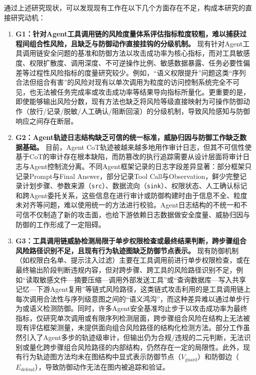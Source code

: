 通过上述研究现状，可以发现现有工作在以下几个方面存在不足，构成本研究的直接研究动机：
\begin{enumerate}
  \item \textbf{G1：针对Agent工具调用链的风险度量体系评估指标粒度较粗，难以捕获过程间组合性风险，且缺乏与防御动作直接挂钩的分级机制。}
  现有针对Agent工具调用链安全问题的基准和防御方法以攻击成功率为核心指标，而对工具敏感度、权限扩散度、调用深度、不可逆操作比例、敏感数据暴露、任务必要性偏差等过程性风险指标的度量研究较少。例如，“语义权限提升”问题这类“序列合法但组合有害”的风险对现有以单次调用为粒度的访问控制系统完全不可见，也无法被任务完成率或攻击成功率等结果导向指标所量化。更重要的是，即使能够输出风险分数，现有方法也缺乏将风险等级直接映射为可操作防御动作（放行/记录/脱敏/人工确认/阻断回滚）的分级机制，导致风险感知与防御响应之间存在断层。

  \item \textbf{G2：Agent轨迹日志结构缺乏可信的统一标准，威胁归因与防御工作缺乏数据基础。}
  目前，Agent CoT轨迹被越来越多地用作审计日志，但其不可信性使基于CoT的审计存在根本缺陷，而防篡改的执行追踪需要从设计层面将审计日志与Agent控制流分离\cite{chu2026systematic,dehghantanha2026sokattacksurfaceagentic}。不同Agent框架记录的日志字段差异显著：部分框架只记录Prompt与Final Answer，部分记录Tool Call与Observation，鲜少完整记录计划步骤、参数来源（\texttt{src}）、数据流向（\texttt{sink}）、权限状态、人工确认标记和跨Agent委托关系\cite{chan2024visibility,microsoft2025taxonomy,wang2026agenttraces}，这些信息在进行审计或防御构建时由于信息不全、粒度未对齐等问题，难以使用统一的方法进行校验。Agent日志结构的不统一和不可信不仅制造了新的攻击面，也给下游依赖日志数据做安全度量、威胁归因与防御的工作形成了一定阻碍。

  \item \textbf{G3：工具调用链威胁检测局限于单步权限检查或最终结果判断，跨步骤组合风险路径识别不足，且现有行为轨迹图缺乏防御节点表示。}
  现有防御机制（如权限白名单、提示注入过滤）主要在工具调用前进行单步权限检查，或在最终输出阶段判断违规内容，但对跨步骤、跨工具的风险路径识别不足，例如“读取敏感文件—摘要压缩—调用外部发送工具”或“查询数据库—写入共享记忆—下游Agent复用”等链式风险路径\cite{dewitt2026openchallenges,debenedetti2025camel,costa2025fides}，这类链式攻击利用的是工具调用链上每次调用合法性与序列级意图之间的“语义鸿沟”，而这种差异难以通过单步行为或语义检测防御。同时，许多Agent安全基准均止步于以攻击成功率为最终指标，仅研究单次调用或有限序列检测层面，跨步骤组合风险在结构上无法被现有评估框架测量，未提供面向组合风险路径的结构化检测方法\cite{zhang2024injectagent,liu2024formalizing,chu2026systematic}。部分工作\cite{wang2025agentarmor,liu2026auditing}虽然引入了Agent多步的轨迹级审计，但输出仍为合规/违规的二元判断，无法识别或量化跨步骤组合风险路径的内部结构，仍然存在一定的局限性。此外，现有行为轨迹图方法\cite{he2025sentinelagent,wang2026aligning}均未在图结构中显式表示防御节点（$V_{\text{guard}}$）和防御边（$E_{\text{defend}}$），导致防御动作无法在图内被追踪和验证。


\end{enumerate}
